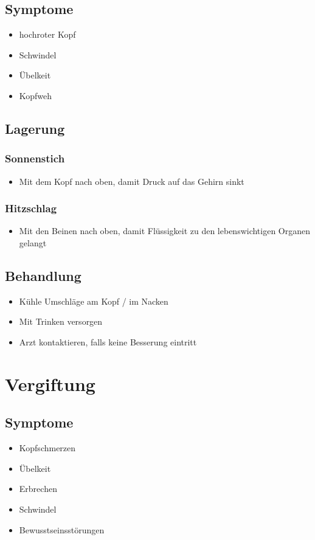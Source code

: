 \section*{Symptome}
\begin{itemize}
    \item hochroter Kopf
    \item Schwindel
    \item Übelkeit
    \item Kopfweh
\end{itemize}

\section*{Lagerung}
\subsection*{Sonnenstich}
\begin{itemize}
    \item Mit dem Kopf nach oben, damit Druck auf das Gehirn sinkt
\end{itemize}

\subsection*{Hitzschlag}
\begin{itemize}
    \item Mit den Beinen nach oben, damit Flüssigkeit zu den lebenswichtigen Organen gelangt
\end{itemize}

\section*{Behandlung}
\begin{itemize}
    \item Kühle Umschläge am Kopf / im Nacken
    \item Mit Trinken versorgen
    \item Arzt kontaktieren, falls keine Besserung eintritt
\end{itemize}

\chapter{Vergiftung}

\section*{Symptome}
\begin{itemize}
    \item Kopfschmerzen
    \item Übelkeit
    \item Erbrechen
    \item Schwindel
    \item Bewusstseinsstörungen
\end{itemize}

